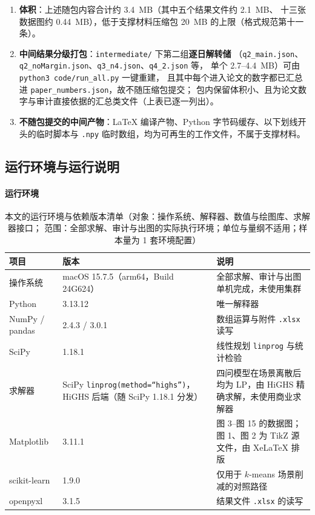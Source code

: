 \begin{enumerate}
  \item \textbf{体积}：上述随包内容合计约 3.4~MB（其中五个结果文件约 2.1~MB、
        十三张数据图约 0.44~MB），低于支撑材料压缩包 20~MB 的上限（格式规范第十一条）。
  \item \textbf{中间结果分级打包}：\texttt{intermediate/} 下第二组\textbf{逐日解转储}
        （\texttt{q2\_main.json}、\texttt{q2\_noMargin.json}、\texttt{q3\_n4.json}、\texttt{q4\_2.json} 等，
        单个 2.7--4.4~MB）可由 \texttt{python3 code/run\_all.py} 一键重建，
        且其中每个进入论文的数字都已汇总进 \texttt{paper\_numbers.json}，故不随压缩包提交；
        包内保留体积小、且为论文数字与审计直接依据的汇总类文件（上表已逐一列出）。
  \item \textbf{不随包提交的中间产物}：LaTeX 编译产物、Python 字节码缓存、以下划线开头的临时脚本与
        \texttt{.npy} 临时数组，均为可再生的工作文件，不属于支撑材料。
\end{enumerate}

\subsection{运行环境与运行说明}

\paragraph{运行环境}

\begin{table}[htbp]
  \centering
  \caption{本文的运行环境与依赖版本清单（对象：操作系统、解释器、数值与绘图库、求解器接口；
            范围：全部求解、审计与出图的实际执行环境；单位与量纲不适用；样本量为 1 套环境配置）}
  \label{tab:env}
  \footnotesize
  \begin{tabularx}{\linewidth}{L{3.4cm} L{4.6cm} Y}
    \toprule
    项目 & 版本 & 说明 \\
    \midrule
    操作系统 & macOS 15.7.5（arm64，Build 24G624） & 全部求解、审计与出图单机完成，未使用集群 \\
    Python & 3.13.12 & 唯一解释器 \\
    NumPy / pandas & 2.4.3 / 3.0.1 & 数组运算与附件 \texttt{.xlsx} 读写 \\
    SciPy & 1.18.1 & 线性规划 \texttt{linprog} 与统计检验 \\
    求解器 & SciPy \texttt{linprog(method=“highs”)}，HiGHS 后端（随 SciPy 1.18.1 分发）
      & 四问模型在场景离散后均为 LP，由 HiGHS 精确求解，未使用商业求解器 \\
    Matplotlib & 3.11.1 & 图 3--图 15 的数据图；图 1、图 2 为 TikZ 源文件，由 XeLaTeX 排版 \\
    scikit-learn & 1.9.0 & 仅用于 $k$-means 场景削减的对照路径 \\
    openpyxl & 3.1.5 & 结果文件 \texttt{.xlsx} 的读写 \\
    \bottomrule
  \end{tabularx}
\end{table}

